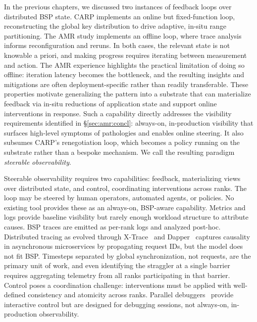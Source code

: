 

In the previous chapters, we discussed two instances of feedback loops over distributed BSP
state.
CARP implements an online but fixed-function loop, reconstructing the global key distribution to
drive adaptive, in-situ range partitioning.
The AMR study implements an offline loop, where trace analysis informs reconfiguration and reruns.
In both cases, the relevant state is not knowable a priori, and making progress requires
iterating between measurement and action.
The AMR experience highlights the practical limitation of doing so offline: iteration latency
becomes the bottleneck, and the resulting insights and mitigations are often deployment-specific
rather than readily transferable.
These properties motivate generalizing the pattern into a substrate that can materialize feedback
via in-situ reductions of application state and support online interventions in response.
Such a capability directly addresses the visibility requirements identified in
\S\ref{sec:amr:concl}: always-on, in-production visibility that surfaces high-level symptoms of
pathologies and enables online steering.
It also subsumes CARP's renegotiation loop, which becomes a policy running on the substrate
rather than a bespoke mechanism.
We call the resulting paradigm \emph{steerable observability}.


Steerable observability requires two capabilities: feedback, materializing views over distributed
state, and control, coordinating interventions across ranks.
The loop may be steered by human operators, automated agents, or policies.
No existing tool provides these as an always-on, BSP-aware capability.
Metrics and logs provide baseline visibility but rarely enough workload structure to attribute
causes.
BSP traces are emitted as per-rank logs and analyzed post-hoc.
Distributed tracing as evolved through
X-Trace~\cite{Fonse2007:X-Trace} and Dapper~\cite{Sigel2010:Dapper} captures causality in
asynchronous microservices by propagating request IDs, but the model does not fit BSP.
Timesteps separated by global synchronization, not requests, are the primary unit of work, and
even identifying the straggler at a single barrier requires aggregating telemetry from all ranks
participating in that barrier.
Control poses a coordination challenge: interventions must be applied with well-defined
consistency and atomicity across ranks.
Parallel debuggers~\cite{:TotalView} provide interactive control but are
designed for debugging sessions, not always-on, in-production observability.


